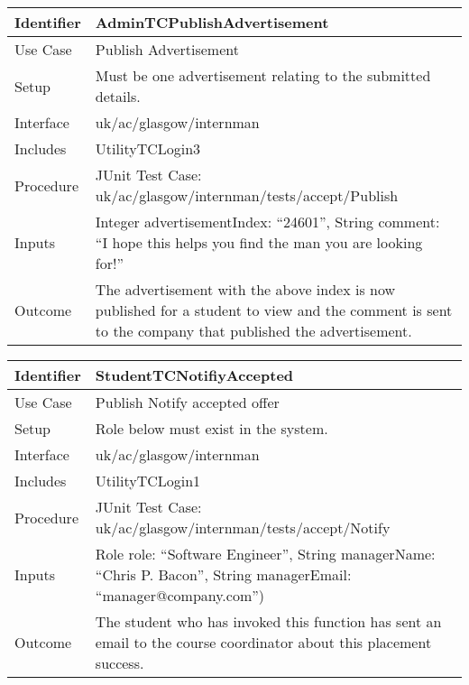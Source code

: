\vspace{2em}

\begin{tabularx}{\textwidth}{|T|L|}
\hline
Identifier & AdminTCPublishAdvertisement\\
\hline
Use Case & Publish Advertisement\\
\hline
Setup & Must be one advertisement relating to the submitted details.\\
\hline
Interface & uk/ac/glasgow/internman\\
\hline
Includes & UtilityTCLogin3\\
\hline
Procedure & JUnit Test Case: uk/ac/glasgow/internman/tests/accept/Publish\\
\hline
Inputs & Integer advertisementIndex: ``24601'', String comment:
``I hope this helps you find the man you are looking for!''\\
\hline
Outcome & The advertisement with the above index is now published for
a student to view and the comment is sent to the company that
published the advertisement.\\
\hline
\end{tabularx}

\vspace{2em}

\begin{tabularx}{\textwidth}{|T|L|}
\hline
Identifier & StudentTCNotifiyAccepted\\
\hline
Use Case & Publish Notify accepted offer\\
\hline
Setup & Role below must exist in the system.\\
\hline
Interface & uk/ac/glasgow/internman\\
\hline
Includes & UtilityTCLogin1\\
\hline
Procedure & JUnit Test Case: uk/ac/glasgow/internman/tests/accept/Notify\\
\hline
Inputs & Role role: ``Software Engineer'', String managerName: ``Chris
P. Bacon'', String managerEmail: ``manager@company.com'')\\
\hline
Outcome & The student who has invoked this function has sent an email
to the course coordinator about this placement success.\\
\hline
\end{tabularx}

\vspace{2em}

